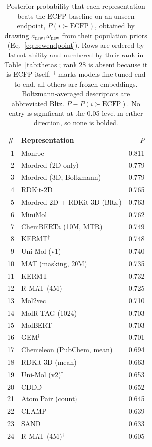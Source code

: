 \documentclass{article}
\begin{document}
\begin{table}[H]
\centering
\footnotesize
\setlength{\tabcolsep}{3pt}
\caption{Posterior probability that each representation beats the ECFP
baseline on an unseen endpoint, $P(i \succ \text{ECFP})$, obtained by drawing
$a_{\text{new}}, \omega_{\text{new}}$ from their population priors
(Eq.~\ref{eq:newendpoint}). Rows are ordered by latent ability and numbered by
their rank in Table~\ref{tab:thetas}; rank 28 is absent because it is ECFP
itself. $^\dagger$ marks models fine-tuned end to end, all others are frozen
embeddings. Boltzmann-averaged descriptors are abbreviated Bltz.
$P \equiv P(i \succ \text{ECFP})$. No entry is significant at the 0.05 level in
either direction, so none is bolded.}
\label{tab:ecfp-new}
\begin{tabular}[t]{@{}rlr@{}}
\toprule
\# & Representation & $P$ \\
\midrule
1 & Monroe & 0.811 \\
2 & Mordred (2D only) & 0.779 \\
3 & Mordred (3D, Boltzmann) & 0.779 \\
4 & RDKit-2D & 0.765 \\
5 & Mordred 2D + RDKit 3D (Bltz.) & 0.763 \\
6 & MiniMol & 0.762 \\
7 & ChemBERTa (10M, MTR) & 0.749 \\
8 & KERMT$^\dagger$ & 0.748 \\
9 & Uni-Mol (v1)$^\dagger$ & 0.740 \\
10 & MAT (masking, 20M) & 0.735 \\
11 & KERMT & 0.732 \\
12 & R-MAT (4M) & 0.725 \\
13 & Mol2vec & 0.710 \\
14 & MolR-TAG (1024) & 0.703 \\
15 & MolBERT & 0.703 \\
16 & GEM$^\dagger$ & 0.701 \\
17 & Chemeleon (PubChem, mean) & 0.694 \\
18 & RDKit-3D (mean) & 0.663 \\
19 & Uni-Mol (v2)$^\dagger$ & 0.653 \\
20 & CDDD & 0.652 \\
21 & Atom Pair (count) & 0.645 \\
22 & CLAMP & 0.639 \\
23 & SAND & 0.633 \\
24 & R-MAT (4M)$^\dagger$ & 0.605 \\

\end{tabular}
\end{table}
\end{document}
